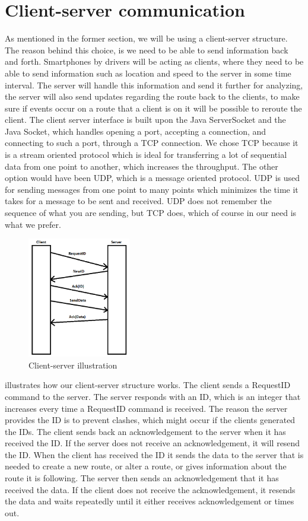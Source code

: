\section{Client-server communication}
As mentioned in the former section, we will be using a client-server structure. The reason behind this choice, is we need to be able to send information back and forth. Smartphones by drivers will be acting as clients, where they need to be able to send information such as location and speed to the server in some time interval. The server will handle this information and send it further for analyzing, the server will also send updates regarding the route back to the clients, to make sure if events occur on a route that a client is on it will be possible to reroute the client.
The client server interface is built upon the Java ServerSocket and the Java Socket, which handles opening a port, accepting a connection, and connecting to such a port, through a TCP connection. 
We chose TCP because it is a stream oriented protocol which is ideal for transferring a lot of sequential data from one point to another, which increases the throughput. The other option would have been UDP, which is a message oriented protocol. UDP is used for sending messages from one point to many points which minimizes the time it takes for a message to be sent and received. UDP does not remember the sequence of what you are sending, but TCP does, which of course in our need is what we prefer. 

\begin{figure}[h!]
  \centering
    \includegraphics[width=0.4\textwidth]{figures/clientserver.png}
    \caption{Client-server illustration}
    \label{fig:clientserver}
\end{figure}

 illustrates how our client-server structure works. The client sends a RequestID command to the server. The server responds with an ID, which is an integer that increases every time a RequestID command is received. The reason the server provides the ID is to prevent clashes, which might occur if the clients generated the IDs. The client sends back an acknowledgement to the server when it has received the ID. If the server does not receive an acknowledgement, it will resend the ID. When the client has received the ID it sends the data to the server that is needed to create a new route, or alter a route, or gives information about the route it is following. The server then sends an acknowledgement that it has received the data. If the client does not receive the acknowledgement, it resends the data and waits repeatedly until it either receives acknowledgement or times out.

